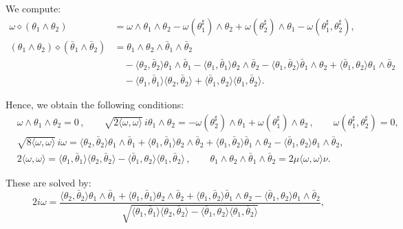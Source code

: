 \documentclass[10pt,a4paper,twoside,reqno]{amsart}
\theoremstyle{plain}
\theoremstyle{definition}
\theoremstyle{remark}
\newcommand{\escal}[1]{\langle#1\rangle}
\begin{document}
\noindent
We compute:
\begin{align*}
\omega \diamond (\theta_1\wedge \theta_2) &= \omega \wedge \theta_1 \wedge \theta_2 - \omega(\theta_1^{\sharp}) \wedge \theta_2 + \omega(\theta_2^{\sharp}) \wedge \theta_1 - \omega(\theta_1^{\sharp} , \theta_2^{\sharp}),\\
(\theta_1 \wedge \theta_2) \diamond (\bar{\theta}_1 \wedge \bar{\theta}_2) &= \theta_1 \wedge \theta_2 \wedge\bar{\theta}_1 \wedge \bar{\theta}_2\\
& \quad - \langle \theta_2 , \bar{\theta}_2 \rangle \theta_1 \wedge \bar{\theta}_1 - \langle \theta_1 , \bar{\theta}_1 \rangle \theta_2 \wedge \bar{\theta}_2 - \langle \theta_1 , \bar{\theta}_2 \rangle \bar{\theta}_1 \wedge \theta_2 + \langle \bar{\theta}_1 , \theta_2 \rangle \theta_1 \wedge \bar{\theta}_2 \\
&\quad - \langle \theta_1 , \bar{\theta}_1 \rangle \langle \theta_2 , \bar{\theta}_2 \rangle + \langle \bar{\theta}_1 , \theta_2 \rangle \langle \theta_1 , \bar{\theta}_2 \rangle.
\end{align*}

\noindent
Hence, we obtain the following conditions:
\begin{eqnarray*}
& \omega \wedge \theta_1 \wedge \theta_2 = 0\, , \qquad  \sqrt{2\escal{\omega,\omega}}\, i \theta_1 \wedge \theta_2  =  -\omega(\theta_2^{\sharp}) \wedge \theta_1 + \omega(\theta_1^{\sharp}) \wedge \theta_2\, , \qquad \omega(\theta_1^{\sharp} , \theta_2^{\sharp}) = 0,\\
&  \sqrt{8 \escal{\omega,\omega}}\, i \omega =  \langle \theta_2 , \bar{\theta}_2 \rangle \theta_1 \wedge \bar{\theta}_1 + \langle \theta_1 , \bar{\theta}_1 \rangle \theta_2 \wedge \bar{\theta}_2 + \langle \theta_1 , \bar{\theta}_2 \rangle \bar{\theta}_1 \wedge \theta_2 - \langle \bar{\theta}_1 , \theta_2 \rangle \theta_1 \wedge \bar{\theta}_2,\\
& 2 \escal{\omega,\omega} =  \langle \theta_1 , \bar{\theta}_1 \rangle \langle \theta_2 , \bar{\theta}_2 \rangle - \langle \bar{\theta}_1 , \theta_2 \rangle \langle \theta_1 , \bar{\theta}_2 \rangle\, , \qquad \theta_1\wedge\theta_2\wedge\bar\theta_1\wedge\bar\theta_2=2\mu\escal{\omega,\omega}\nu.
\end{eqnarray*}

\noindent
These are solved by:
\begin{equation}
\label{eq:omega_in_terms_of_thetas}
2i \omega = \frac{\langle \theta_2 , \bar{\theta}_2 \rangle \theta_1 \wedge \bar{\theta}_1 + \langle \theta_1 , \bar{\theta}_1 \rangle \theta_2 \wedge \bar{\theta}_2 + \langle \theta_1 , \bar{\theta}_2 \rangle \bar{\theta}_1 \wedge \theta_2 - \langle \bar{\theta}_1 , \theta_2 \rangle \theta_1 \wedge \bar{\theta}_2}{\sqrt{\langle \theta_1 , \bar{\theta}_1 \rangle \langle \theta_2 , \bar{\theta}_2 \rangle - \langle \bar{\theta}_1 , \theta_2 \rangle \langle \theta_1 , \bar{\theta}_2 \rangle}},
\end{equation}
\end{document}
